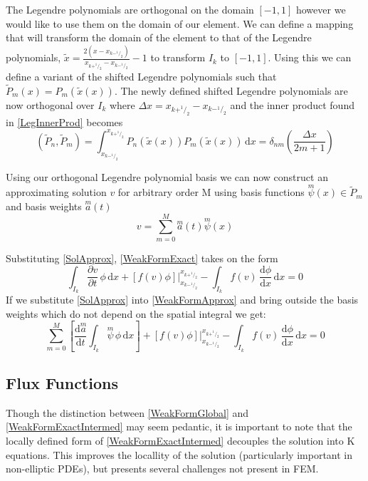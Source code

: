 \documentclass[letterpaper]{article}
\begin{document}
The Legendre polynomials are orthogonal on the domain $[-1,1]$ however we would like to use them on the domain of our element. We can define a mapping that will transform the domain of the element to that of the Legendre polynomials, $\tilde{x} = \frac{2(x-x_{k-^1\!/_2})}{x_{k+^1\!/_2}-x_{k-^1\!/_2}}-1$ to transform $I_k$ to $[-1,1]$. Using this we can define a variant of the shifted Legendre polynomials such that $\tilde{P}_m(x) = P_m(\tilde{x}(x))$. The newly defined shifted Legendre polynomials are now orthogonal over $I_k$ where $\Delta x = x_{k+^1\!/_2}-x_{k-^1\!/_2}$ and the inner product found in \eqref{LegInnerProd} becomes
	\begin{equation}\label{ShiftLegInnerProd}
	(\tilde{P}_n,\tilde{P}_m) = \int_{x_{k-^1\!/_2}}^{x_{k+^1\!/_2}} \! P_n(\tilde{x}(x)) P_m(\tilde{x}(x)) \, \mathrm{d}x = \delta_{nm} \left(\frac{\Delta x}{2m+1}\right)
	\end{equation}

Using our orthogonal Legendre polynomial basis we can now construct an approximating solution $v$ for arbitrary order M using basis functions $\overset{m}{\psi}(x) \in \tilde{P}_m$ and basis weights $\overset{m}{a}(t)$
	\begin{equation}\label{SolApprox}
	v = \sum_{m=0}^M \overset{m}{a}(t)\overset{m}{\psi}(x)
	\end{equation}


Substituting \eqref{SolApprox}, \eqref{WeakFormExact} takes on the form
	\begin{equation}\label{WeakFormApprox}
	\int_{I_k}\! \frac{\partial v}{\partial t} \,\phi \,\mathrm{d}x +
	[f(v)\phi] \Big\rvert_{x_{k-^1\!/_2}}^{x_{k+^1\!/_2}} -
	\int_{I_k}\! f(v) \,\frac{\mathrm{d} \phi}{\mathrm{d} x} \,\mathrm{d}x = 0
	\end{equation}
If we substitute \eqref{SolApprox} into \eqref{WeakFormApprox} and bring outside the basis weights which do not depend on the spatial integral we get:
	\begin{equation}\label{WeakFormApproxIntermed}
	\sum_{m=0}^M \left[ \frac{\mathrm{d}\overset{m}{a}}{\mathrm{d} t} \int_{I_k}\! \overset{m}{\psi} \,\phi \,\mathrm{d}x \right] + 
	[f(v)\phi] \Big\rvert_{x_{k-^1\!/_2}}^{x_{k+^1\!/_2}} -
	 \int_{I_k}\! f(v) \,\frac{\mathrm{d} \phi}{\mathrm{d} x} \,\mathrm{d}x = 0
	\end{equation}

\subsection{Flux Functions}
Though the distinction between \eqref{WeakFormGlobal} and \eqref{WeakFormExactIntermed} may seem pedantic, it is important to note that the locally defined form of \eqref{WeakFormExactIntermed} decouples the solution into K equations. This improves the locallity of the solution (particularly important in non-elliptic PDEs), but presents several challenges not present in FEM.
\end{document}
